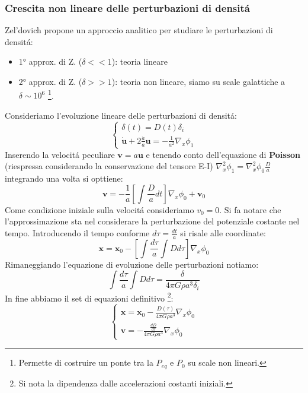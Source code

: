\documentclass[12pt, a4paper]{article}
\begin{document}
\subsubsection{Crescita non lineare delle perturbazioni di densit\'{a}}
Zel'dovich propone un approccio analitico per studiare le perturbazioni di densit\'{a}:
\begin{itemize}
\item $1°$ approx. di Z. ($\delta <<1$): teoria lineare
\item $2°$ approx. di Z. ($\delta>>1$): teoria non lineare, siamo su scale galattiche  a $\delta\sim 10^6$ \footnote{Permette di costruire un ponte tra la $P_{eq}$ e $P_0$ su scale non lineari.}.
\end{itemize}
Consideriamo l'evoluzione lineare delle perturbazioni di densit\'{a}:
\begin{equation}
\begin{cases}
\delta(t)=D(t) \delta_i
\\
\dot{\mathbf{u}}+2\frac{\dot{a}}{a}\mathbf{u}=-\frac{1}{a^2}\nabla_x \phi_1
\end{cases}
\end{equation}
Inserendo la velocit\'{a} peculiare $\mathbf{v}=a\mathbf{u}$ e tenendo conto dell'equazione di \textbf{Poisson} (riespressa considerando la conservazione del tensore E-I) $\nabla_x^2\phi_1=\nabla_x^2\phi_0 \frac{D}{a}$  integrando una volta si opttiene:
\begin{equation}
\mathbf{v}=-\frac{1}{a} \left [ \int \frac{D}{a}dt\right ]\nabla_x \phi_0 + \mathbf{v}_0
\end{equation}
Come condizione iniziale sulla velocit\'{a} consideriamo $v_0=0$. Si fa notare che l'approssimazione sta nel considerare la perturbazione del potenziale costante nel tempo. Introducendo il tempo conforme $d\tau=\frac{dt}{a}$ si risale alle coordinate:
\begin{equation}
\mathbf{x}=\mathbf{x}_0-\left [ \int \frac{d\tau}{a}\int D d\tau\right ]\nabla_x \phi_0 
\end{equation}
Rimaneggiando l'equazione di evoluzione delle perturbazioni notiamo:
\begin{equation}
\int \frac{d\tau}{a}\int D d\tau=\frac{\delta}{4 \pi G \rho a^3 \delta_i}
\end{equation}
In fine abbiamo il set di equazioni definitivo \footnote{Si nota la dipendenza dalle accelerazioni costanti iniziali.}:
\begin{equation}
\begin{cases}
\mathbf{x}=\mathbf{x}_0- \frac{D(\tau)}{4 \pi G \rho a^3}\nabla_x \phi_0 
\\
\mathbf{v}=- \frac{\frac{dD}{d\tau}}{4 \pi G \rho a^3}\nabla_x \phi_0 
\end{cases}
\end{equation}
\end{document}
